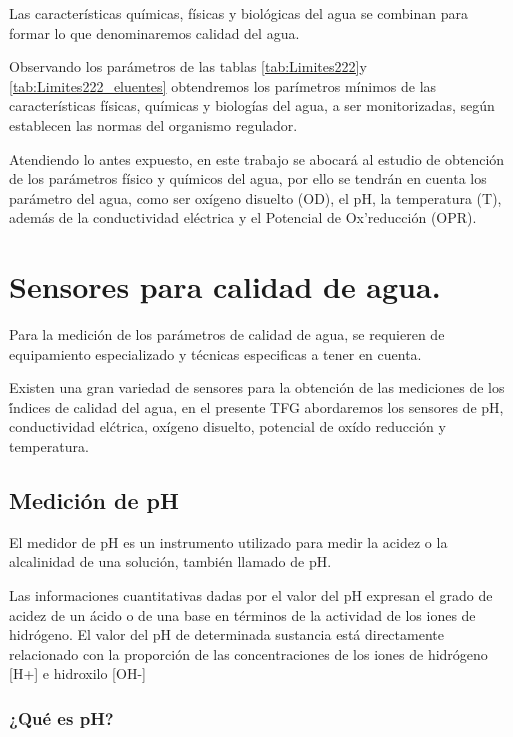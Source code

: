 Las caracter\'isticas qu\'imicas, f\'isicas y biol\'ogicas del agua se combinan para formar lo que denominaremos calidad del agua.

Observando los par\'ametros de las tablas \ref{tab:Limites222}y \ref{tab:Limites222_eluentes} obtendremos los par\'imetros m\'inimos de las caracter\'isticas f\'isicas, qu\'imicas y biolog\'ias del agua, a ser monitorizadas, seg\'un establecen las normas del organismo regulador. 

Atendiendo lo antes expuesto, en este trabajo se abocar\'a al estudio de obtenci\'on de los par\'ametros f\'isico y qu\'imicos del agua, por ello se tendr\'an en cuenta los  par\'ametro del agua, como ser ox\'igeno disuelto (OD), el pH, la temperatura (T), adem\'as de la conductividad el\'ectrica y el Potencial de Ox'\igeno reducci\'on (OPR). 

\section{Sensores para calidad de agua.}

Para la medici\'on de los par\'ametros de calidad de agua, se requieren de equipamiento especializado y t\'ecnicas especificas a tener en cuenta.

Existen una gran variedad de sensores para la obtención de las mediciones de los \'índices de calidad del agua, en el presente TFG abordaremos los sensores de pH, conductividad el\'ctrica, ox\'igeno disuelto, potencial de ox\'ido reducción y temperatura. 

\subsection{Medición de pH}
El medidor de pH es un instrumento utilizado para medir la acidez o la alcalinidad de una solución, también llamado de pH. 

Las informaciones cuantitativas dadas por el valor del pH expresan el grado de acidez de un \'acido o de una base en t\'erminos de la actividad de los iones de hidr\'ogeno. El valor del pH de determinada sustancia est\'a directamente relacionado con la proporci\'on de las concentraciones de los iones de hidrógeno [H+] e hidroxilo [OH-] \cite{omega_medidores_nodate}
\subsubsection{¿Qué es pH?}

